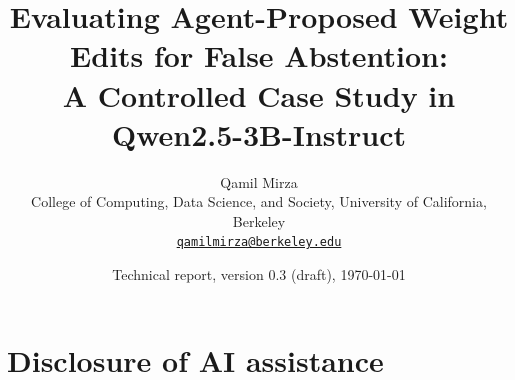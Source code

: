 \documentclass[11pt]{article}
\title{Evaluating Agent-Proposed Weight Edits for False Abstention:\\[2pt]
\large A Controlled Case Study in Qwen2.5-3B-Instruct}
\author{Qamil Mirza\\[2pt]
\small College of Computing, Data Science, and Society, University of California, Berkeley\\
\small\href{mailto:qamilmirza@berkeley.edu}{\texttt{qamilmirza@berkeley.edu}}}
\date{\vspace{-0.6em}Technical report, version 0.3 (draft), \today}
\newif\ifdraft \drafttrue
\begin{document}
\maketitle
\vspace{-1.5em}

\begin{abstract}

\end{abstract}














\section*{Disclosure of AI assistance}


\ifdraft

\fi




\appendix



\clearpage


\end{document}

